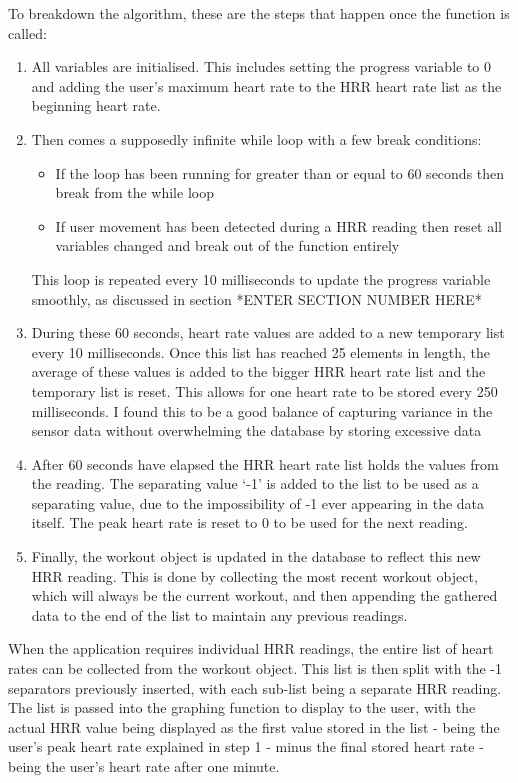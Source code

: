 \documentclass{l4proj}
\begin{document}
To breakdown the algorithm, these are the steps that happen once the function is called:

\begin{enumerate}
    \item All variables are initialised. This includes setting the progress variable to 0 and adding the user’s maximum heart rate to the HRR heart rate list as the beginning heart rate.
    \item Then comes a supposedly infinite while loop with a few break conditions:
    \begin{itemize}
        \item If the loop has been running for greater than or equal to 60 seconds then break from the while loop
        \item If user movement has been detected during a HRR reading then reset all variables changed and break out of the function entirely
    \end{itemize}
    This loop is repeated every 10 milliseconds to update the progress variable smoothly, as discussed in section *ENTER SECTION NUMBER HERE*
    \item During these 60 seconds, heart rate values are added to a new temporary list every 10 milliseconds. Once this list has reached 25 elements in length, the average of these values is added to the bigger HRR heart rate list and the temporary list is reset. This allows for one heart rate to be stored every 250 milliseconds. I found this to be a good balance of capturing variance in the sensor data without overwhelming the database by storing excessive data
    \item After 60 seconds have elapsed the HRR heart rate list holds the values from the reading. The separating value ‘-1’ is added to the list to be used as a separating value, due to the impossibility of -1 ever appearing in the data itself. The peak heart rate is reset to 0 to be used for the next reading.
    \item Finally, the workout object is updated in the database to reflect this new HRR reading. This is done by collecting the most recent workout object, which will always be the current workout, and then appending the gathered data to the end of the list to maintain any previous readings.
\end{enumerate}

When the application requires individual HRR readings, the entire list of heart rates can be collected from the workout object. This list is then split with the -1 separators previously inserted, with each sub-list being a separate HRR reading. The list is passed into the graphing function to display to the user, with the actual HRR value being displayed as the first value stored in the list - being the user’s peak heart rate explained in step 1 - minus the final stored heart rate - being the user’s heart rate after one minute.
\end{document}
